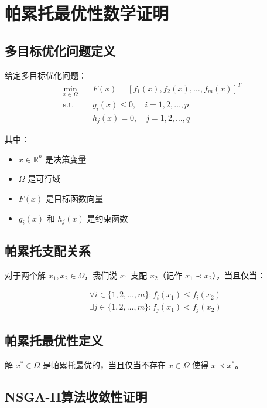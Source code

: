 
\section{帕累托最优性数学证明}

\subsection{多目标优化问题定义}

给定多目标优化问题：
\begin{align}
\min_{x \in \Omega} \quad & F(x) = [f_1(x), f_2(x), \ldots, f_m(x)]^T \\
\text{s.t.} \quad & g_i(x) \leq 0, \quad i = 1, 2, \ldots, p \\
& h_j(x) = 0, \quad j = 1, 2, \ldots, q
\end{align}

其中：
\begin{itemize}
\item $x \in \mathbb{R}^n$ 是决策变量
\item $\Omega$ 是可行域
\item $F(x)$ 是目标函数向量
\item $g_i(x)$ 和 $h_j(x)$ 是约束函数
\end{itemize}

\subsection{帕累托支配关系}

对于两个解 $x_1, x_2 \in \Omega$，我们说 $x_1$ 支配 $x_2$（记作 $x_1 \prec x_2$），当且仅当：

\begin{align}
& \forall i \in \{1, 2, \ldots, m\}: f_i(x_1) \leq f_i(x_2) \\
& \exists j \in \{1, 2, \ldots, m\}: f_j(x_1) < f_j(x_2)
\end{align}

\subsection{帕累托最优性定义}

解 $x^* \in \Omega$ 是帕累托最优的，当且仅当不存在 $x \in \Omega$ 使得 $x \prec x^*$。

\subsection{NSGA-II算法收敛性证明}


